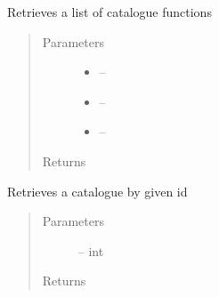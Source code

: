 \documentclass[letterpaper,10pt,english]{sphinxmanual}
\begin{document}

\begin{fulllineitems}
\label{_source/son_editor.impl:son_editor.impl.catalogue_servicesimpl.get_all_in_catalogue}
Retrieves a list of catalogue functions
\begin{quote}\begin{description}
\item[{Parameters}] \leavevmode\begin{itemize}
\item {} 
 -- 

\item {} 
 -- 

\item {} 
 -- 

\end{itemize}

\item[{Returns}] \leavevmode


\end{description}\end{quote}

\end{fulllineitems}


\begin{fulllineitems}
\label{_source/son_editor.impl:son_editor.impl.catalogue_servicesimpl.get_catalogue}
Retrieves a catalogue by given id
\begin{quote}\begin{description}
\item[{Parameters}] \leavevmode
{} -- int

\item[{Returns}] \leavevmode


\end{description}\end{quote}

\end{fulllineitems}
\end{document}
